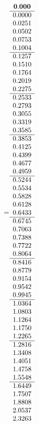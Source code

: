 =\hbox{$\begin{array}{c}
\bf 0.000 
 \\ \hline 
  0.0000 \\ 
  0.0251 \\ 
  0.0502 \\ 
  0.0753 \\ 
  0.1004
 \\ \hline 
  0.1257 \\ 
  0.1510 \\ 
  0.1764 \\ 
  0.2019 \\ 
  0.2275
 \\ \hline 
  0.2533 \\ 
  0.2793 \\ 
  0.3055 \\ 
  0.3319 \\ 
  0.3585
 \\ \hline 
  0.3853 \\ 
  0.4125 \\ 
  0.4399 \\ 
  0.4677 \\ 
  0.4959
 \\ \hline 
  0.5244 \\ 
  0.5534 \\ 
  0.5828 \\ 
  0.6128 \\ 
  0.6433
 \\ \hline 
  0.6745 \\ 
  0.7063 \\ 
  0.7388 \\ 
  0.7722 \\ 
  0.8064
 \\ \hline 
  0.8416 \\ 
  0.8779 \\ 
  0.9154 \\ 
  0.9542 \\ 
  0.9945
 \\ \hline 
  1.0364 \\ 
  1.0803 \\ 
  1.1264 \\ 
  1.1750 \\ 
  1.2265
 \\ \hline 
  1.2816 \\ 
  1.3408 \\ 
  1.4051 \\ 
  1.4758 \\ 
  1.5548
 \\ \hline 
  1.6449 \\ 
  1.7507 \\ 
  1.8808 \\ 
  2.0537 \\ 
  2.3263
 \end{array}$}
